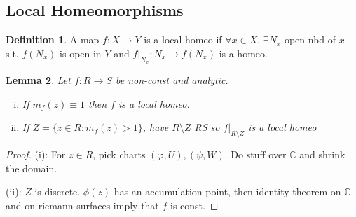\documentclass{article}
\theoremstyle{definition}
\newtheorem{defn}{Definition}[section]
\theoremstyle{remark}
\theoremstyle{plain}
\newtheorem{lem}[defn]{Lemma}
\newcommand{\CC}{\mathbb{C}}
\begin{document}
\subsection{Local Homeomorphisms}
\begin{defn}
    A map $f:X\to Y$ is a local-homeo if $\forall x\in X$, $\exists N_x$ open nbd of $x$ s.t. $f(N_x)$ is open in $Y$ and $f|_{N_x}:N_x\to f(N_x)$ is a homeo.
\end{defn}
\begin{lem}
    Let $f:R\to S$ be non-const and analytic.
    \begin{enumerate}[(i)]
        \item If $m_f(z)\equiv 1$ then $f$ is a local homeo.
        \item If $Z=\{z\in R: m_f(z)>1\}$, have $R\setminus Z$ RS so $f|_{R\setminus Z}$ is a local homeo
    \end{enumerate}
\end{lem}
\begin{proof}
    (i): For $z\in R$, pick charts $(\varphi, U), (\psi,W)$. Do stuff over $\CC$ and shrink the domain.

    (ii): $Z$ is discrete. $\phi(z)$ has an accumulation point, then identity theorem on $\CC$ and on riemann surfaces imply that $f$ is const.
\end{proof}
\end{document}
